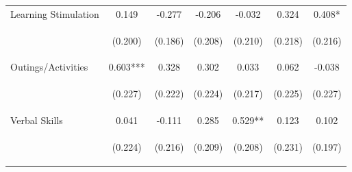 \begin{tabular}{lcccccc}
\noalign{\smallskip}Learning Stimulation & 0.149 & -0.277 & -0.206 & -0.032 & 0.324 & 0.408*\\
 & \begin{footnotesize}(0.200)\end{footnotesize} & \begin{footnotesize}(0.186)\end{footnotesize} & \begin{footnotesize}(0.208)\end{footnotesize} & \begin{footnotesize}(0.210)\end{footnotesize} & \begin{footnotesize}(0.218)\end{footnotesize} & \begin{footnotesize}(0.216)\end{footnotesize}\\
\noalign{\smallskip}Outings/Activities & 0.603*** & 0.328 & 0.302 & 0.033 & 0.062 & -0.038\\
 & \begin{footnotesize}(0.227)\end{footnotesize} & \begin{footnotesize}(0.222)\end{footnotesize} & \begin{footnotesize}(0.224)\end{footnotesize} & \begin{footnotesize}(0.217)\end{footnotesize} & \begin{footnotesize}(0.225)\end{footnotesize} & \begin{footnotesize}(0.227)\end{footnotesize}\\
\noalign{\smallskip}Verbal Skills & 0.041 & -0.111 & 0.285 & 0.529** & 0.123 & 0.102\\
 & \begin{footnotesize}(0.224)\end{footnotesize} & \begin{footnotesize}(0.216)\end{footnotesize} & \begin{footnotesize}(0.209)\end{footnotesize} & \begin{footnotesize}(0.208)\end{footnotesize} & \begin{footnotesize}(0.231)\end{footnotesize} & \begin{footnotesize}(0.197)\end{footnotesize}\\

\end{tabular}

